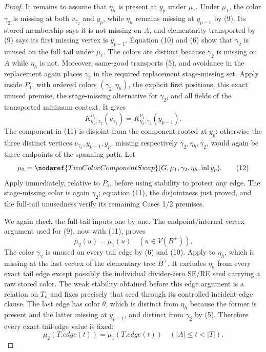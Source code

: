 \begin{proof}
It remains to assume that \(\eta_h\) is present at \(y_p\) under
\(\mu_1\).  Under \(\mu_1\), the color \(\gamma_2\) is missing at both
\(v_{\gamma_2}\) and \(y_p\), while \(\eta_h\) remains missing at
\(y_{p-1}\) by (9).  Its stored membership says it is not missing on
\(A\), and elementarity transported by (9) says its first missing vertex
is \(y_{p-1}\).  Equation (10) and (6) show that \(\gamma_2\) is unused
on the full tail under \(\mu_1\).  The colors are distinct because
\(\gamma_2\) is missing on \(A\) while \(\eta_h\) is not.  Moreover,
same-good transports (5), and avoidance in the replacement
 again places \(\gamma_2\) in the required
replacement stage-missing set.  Apply  inside
\(P_1\), with ordered colors \((\gamma_2,\eta_h)\), the explicit first
positions, this exact unused premise, the stage-missing alternative for
\(\gamma_2\), and all fields of the transported minimum context.  It
gives
\[
 K_{\eta_h,\gamma_2}^{\mu_1}(v_{\gamma_2})
       =K_{\eta_h,\gamma_2}^{\mu_1}(y_{p-1}).                \tag{11}
\]
The component in (11) is disjoint from the component rooted at \(y_p\):
otherwise the three distinct vertices \(v_{\gamma_2},y_{p-1},y_p\),
missing respectively \(\gamma_2,\eta_h,\gamma_2\), would again be three
endpoints of the spanning path.  Let
\[
 \mu_2=\noderef{TwoColorComponentSwap}
       (G,\mu_1,\gamma_2,\eta_h,\operatorname{inl}y_p).      \tag{12}
\]
Apply  immediately, relative to \(P_1\),
before using stability to protect any edge.  The stage-missing color is
again \(\gamma_2\); equation (11), the disjointness just proved, and the
full-tail unusedness verify its remaining Cases 1/2 premises.

We again check the full-tail inputs one by one.  The endpoint/internal
vertex argument used for (9), now with (11), proves
\[
 \overline\mu_2(u)=\overline\mu_1(u)
                    \quad(u\in V(B^+)).                     \tag{13}
\]
The color \(\gamma_2\) is unused on every tail edge by (6) and (10).
Apply  to \(\eta_h\), which
is missing at the last vertex of the elementary tree \(B^+\).  It excludes
\(\eta_h\) from every exact tail edge except possibly the individual
divider-zero SE/RE seed carrying a raw stored color.  The weak stability
obtained before this edge argument is a  relation
on \(T_n\) and fixes precisely that seed through its
controlled incident-edge clause.  The last edge has color \(\theta\),
which is distinct from \(\eta_h\) because the former is present and the
latter missing at \(y_{p-1}\), and distinct from \(\gamma_2\) by (5).
Therefore every exact tail-edge value is fixed:
\[
 \mu_2(T.\mathit{edge}(t))=\mu_1(T.\mathit{edge}(t))
                    \quad(|A|\le t<|T|).                    \tag{14}
\]


\end{proof}
